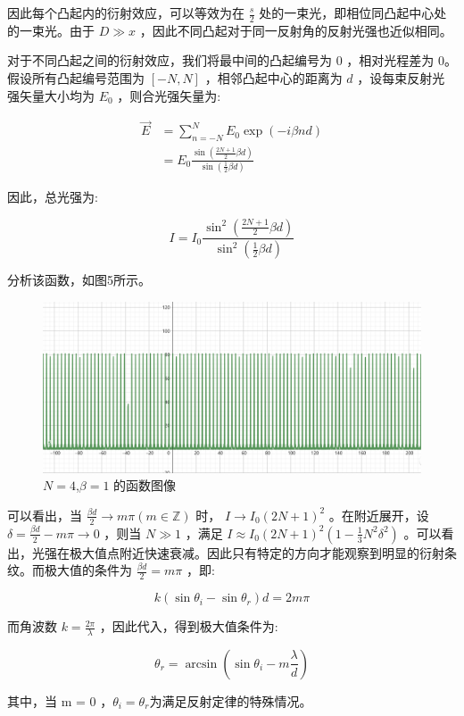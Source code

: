 \documentclass[fontset=windows]{article}
\begin{document}
因此每个凸起内的衍射效应，可以等效为在 $\frac{s}{2}$ 处的一束光，即相位同凸起中心处的一束光。由于 $D \gg x$ ，因此不同凸起对于同一反射角的反射光强也近似相同。

对于不同凸起之间的衍射效应，我们将最中间的凸起编号为 0 ，相对光程差为 0。假设所有凸起编号范围为 $[-N,N]$ ，相邻凸起中心的距离为 $d$ ，设每束反射光强矢量大小均为 $E_0$ ，则合光强矢量为:

$$
\begin{aligned}
    \vec{E} &= \sum_{n = -N}^{N} E_0 \exp(-i\beta n d) \\
            &= E_0 \frac{\sin(\frac{2N + 1}{2}\beta d)}{\sin(\frac{1}{2}\beta d)}
\end{aligned}
$$

因此，总光强为:

$$
I = I_0 \frac{\sin^2(\frac{2N + 1}{2}\beta d)}{\sin^2(\frac{1}{2}\beta d)}
$$

分析该函数，如图5所示。

\begin{figure}[htbp]
	\centering
	\includegraphics[scale=0.2]{4.png}
	\caption{ $N = 4$,$\beta = 1$ 的函数图像}
	\label{5}
\end{figure}

可以看出，当 $\frac{\beta d}{2} \rightarrow m \pi (m\in\mathbb{Z})$ 时， $I\rightarrow I_0 (2N + 1)^2$ 。在附近展开，设 $\delta = \frac{\beta d}{2} - m \pi \rightarrow 0$ ，则当 $N \gg 1$ ，满足 $I \approx I_0 (2N + 1)^2 (1 -  \frac{1}{3}N^2 \delta^2)$ 。可以看出，光强在极大值点附近快速衰减。因此只有特定的方向才能观察到明显的衍射条纹。而极大值的条件为 $\frac{\beta d}{2}  = m \pi$ ，即:

$$
k(\sin\theta_i - \sin\theta_r) d = 2m \pi
$$

而角波数 $k = \frac{2\pi}{\lambda}$ ，因此代入，得到极大值条件为:

$$
\theta_r = \arcsin (\sin\theta_i - m\frac{\lambda}{d})
$$

其中，当 m = 0 ，$\theta_i = \theta_r$为满足反射定律的特殊情况。
\end{document}
